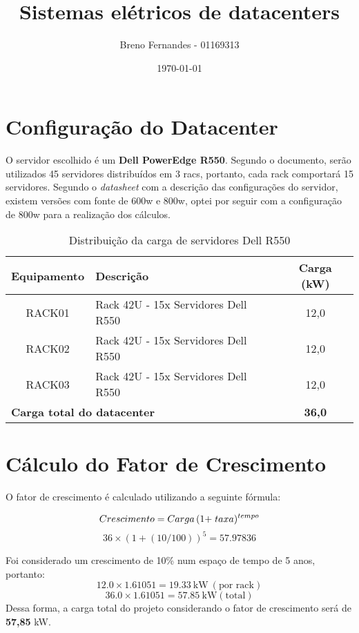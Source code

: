 \documentclass[12pt]{article}
\title{Sistemas elétricos de datacenters}
\author{Breno Fernandes - 01169313}
\date{\today}
\begin{document}
\maketitle

\section*{Configuração do Datacenter}
O servidor escolhido é um \textbf{Dell PowerEdge R550}. Segundo o documento, serão utilizados 45 servidores distribuídos em 3 racs, portanto, cada rack comportará 15 servidores.
Segundo o \textit{datasheet} com a descrição das configurações do servidor, existem versões com fonte de 600w e 800w, optei por seguir com a configuração de 800w para a realização dos cálculos.

\renewcommand{\arraystretch}{1.3}
\begin{table}[h]
    \centering
    \begin{tabular}{|c|l|c|}
        \hline
        \textbf{Equipamento} & \textbf{Descrição} & \textbf{Carga (kW)} \\
        \hline
        RACK01 & Rack 42U - 15x Servidores Dell R550 & 12,0 \\
        \hline
        RACK02 & Rack 42U - 15x Servidores Dell R550 & 12,0 \\
        \hline
        RACK03 & Rack 42U - 15x Servidores Dell R550 & 12,0 \\
        \hline
        \multicolumn{2}{|l|}{\textbf{Carga total do datacenter}} & \textbf{36,0} \\
        \hline
    \end{tabular}
    \caption{Distribuição da carga de servidores Dell R550}
\end{table}

\section*{Cálculo do Fator de Crescimento}

O fator de crescimento é calculado utilizando a seguinte fórmula:

\[
  {Crescimento} = {Carga} \left(1 + \right.{taxa})^{tempo}
$$$$
\]
\[
36 \times (1 + (10/100))^5 = 57.97836
\]

Foi considerado um crescimento de 10\% num espaço de tempo de 5 anos, portanto:
\[
12.0 \times 1.61051 = 19.33 \ \mathrm{kW} \ (\text{por\ rack})
\]
\[
36.0 \times 1.61051 = 57.85 \ \mathrm{ kW (total)}
\]
Dessa forma, a carga total do projeto considerando o fator de crescimento será de \textbf{57,85} kW.
\end{document}
